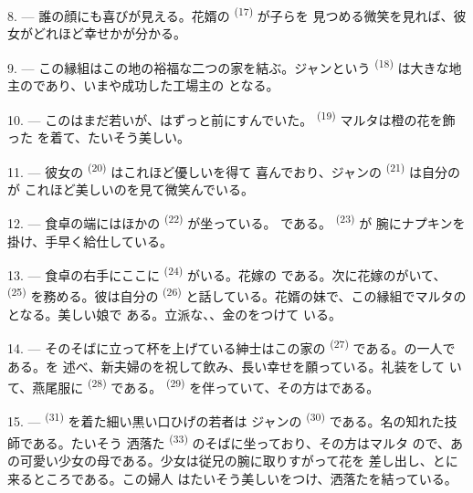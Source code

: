 \VUsaut{3.0mm}

8. --- 誰の顔にも喜びが見える。花婿の \textsuperscript{(17)} が子らを
見つめる微笑を見れば、彼女がどれほど幸せかが分かる。

9. --- この縁組はこの地の裕福な二つの家を結ぶ。ジャンという
\textsuperscript{(18)} は大きな地主のであり、いまや成功した工場主の
となる。

10. --- このはまだ若いが、はずっと前にすんでいた。
 \textsuperscript{(19)} マルタは橙の花を飾った
を着て、たいそう美しい。

11. --- 彼女の \textsuperscript{(20)} はこれほど優しいを得て
喜んでおり、ジャンの \textsuperscript{(21)} は自分のが
これほど美しいのを見て微笑んでいる。

12. --- 食卓の端にはほかの \textsuperscript{(22)} が坐っている。
である。 \textsuperscript{(23)} が
腕にナプキンを掛け、手早く給仕している。

\VUsaut{3.0mm}

13. --- 食卓の右手にここに \textsuperscript{(24)} がいる。花嫁の
である。次に花嫁のがいて、
\textsuperscript{(25)} を務める。彼は自分の \textsuperscript{(26)}
と話している。花婿の妹で、この縁組でマルタのとなる。美しい娘で
ある。立派な、、金のをつけて
いる。

14. --- そのそばに立って杯を上げている紳士はこの家の
\textsuperscript{(27)} である。の一人である。を
述べ、新夫婦のを祝して飲み、長い幸せを願っている。礼装をして
いて、燕尾服に \textsuperscript{(28)} である。
\textsuperscript{(29)} を伴っていて、その方はである。

15. ---  \textsuperscript{(31)} を着た細い黒い口ひげの若者は
ジャンの \textsuperscript{(30)} である。名の知れた技師である。たいそう
洒落た \textsuperscript{(33)} のそばに坐っており、その方はマルタ
ので、あの可愛い少女の母である。少女は従兄の腕に取りすがって花を
差し出し、とに来るところである。この婦人
はたいそう美しいをつけ、洒落たを結っている。

